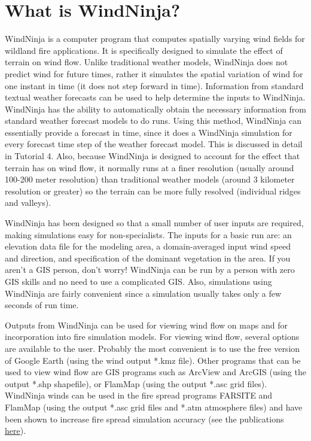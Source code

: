 \documentclass[12pt]{article}
\begin{document}
\section*{What is WindNinja?}
WindNinja is a computer program that computes spatially varying wind fields for wildland fire applications.  It is specifically designed to simulate the effect of terrain on wind flow.  Unlike traditional weather models, WindNinja does not predict wind for future times, rather it simulates the spatial variation of wind for one instant in time (it does not step forward in time).  Information from standard textual weather forecasts can be used to help determine the inputs to WindNinja.  WindNinja has the ability to automatically obtain the necessary information from standard weather forecast models to do runs.  Using this method, WindNinja can essentially provide a forecast in time, since it does a WindNinja simulation for every forecast time step of the weather forecast model.  This is discussed in detail in Tutorial 4.  Also, because WindNinja is designed to account for the effect that terrain has on wind flow, it normally runs at a finer resolution (usually around 100-200 meter resolution) than traditional weather models (around 3 kilometer resolution or greater) so the terrain can be more fully resolved (individual ridges and valleys).

WindNinja has been designed so that a small number of user inputs are required, making simulations easy for non-specialists.  The inputs for a basic run are:  an elevation data file for the modeling area, a domain-averaged input wind speed and direction, and specification of the dominant vegetation in the area.  If you aren’t a GIS person, don’t worry!  WindNinja can be run by a person with zero GIS skills and no need to use a complicated GIS.  Also, simulations using WindNinja are fairly convenient since a simulation usually takes only a few seconds of run time.

Outputs from WindNinja can be used for viewing wind flow on maps and for incorporation into fire simulation models.  For viewing wind flow, several options are available to the user.  Probably the most convenient is to use the free version of Google Earth (using the wind output *.kmz file).  Other programs that can be used to view wind flow are GIS programs such as ArcView and ArcGIS (using the output *.shp shapefile), or FlamMap (using the output *.asc grid files).  WindNinja winds can be used in the fire spread programs FARSITE and FlamMap (using the output *.asc grid files and *.atm atmosphere files) and have been shown to increase fire spread simulation accuracy (see the publications \href{http://firelab.org/project/windninja}{here}).
\end{document}
